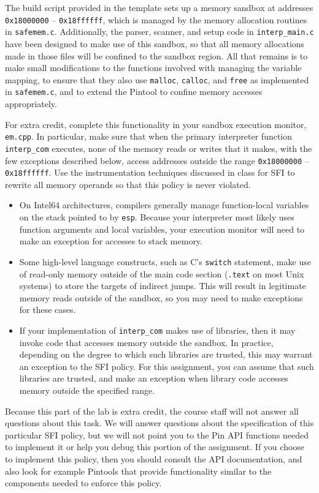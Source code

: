 \documentclass[11pt]{article}
\begin{document}
The build script provided in the template sets up a memory sandbox at addresses \verb'0x18000000' -- \verb'0x18ffffff', which is managed by the memory allocation routines in \verb'safemem.c'. Additionally, the parser, scanner, and setup code in \verb'interp_main.c' have been designed to make use of this sandbox, so that all memory allocations made in those files will be confined to the sandbox region. All that remains is to make small modifications to the functions involved with managing the variable mapping, to ensure that they also use \verb'malloc', \verb'calloc', and \verb'free' as implemented in \verb'safemem.c', and to extend the Pintool to confine memory accesses appropriately.

For extra credit, complete this functionality in your sandbox execution monitor, \verb'em.cpp'. In particular, make sure that when the primary interpreter function \verb'interp_com' executes, none of the memory reads or writes that it makes, with the few exceptions described below, access addresses outside the range \verb'0x18000000' -- \verb'0x18ffffff'. Use the instrumentation techniques discussed in class for SFI to rewrite all memory operands so that this policy is never violated.
\begin{itemize}
\item On Intel64 architectures, compilers generally manage function-local variables on the stack pointed to by \verb'esp'. Because your interpreter most likely uses function arguments and local variables, your execution monitor will need to make an exception for accesses to stack memory.
\item Some high-level language constructs, such as C's \verb'switch' statement, make use of read-only memory outside of the main code section (\verb'.text' on most Unix systems) to store the targets of indirect jumps. This will result in legitimate memory reads outside of the sandbox, so you may need to make exceptions for these cases.
\item If your implementation of \verb'interp_com' makes use of libraries, then it may invoke code that accesses memory outside the sandbox. In practice, depending on the degree to which such libraries are trusted, this may warrant an exception to the SFI policy. For this assignment, you can assume that such libraries are trusted, and make an exception when library code accesses memory outside the specified range.
\end{itemize}
Because this part of the lab is extra credit, the course staff will not answer all questions about this task. We will answer questions about the specification of this particular SFI policy, but we will not point you to the Pin API functions needed to implement it or help you debug this portion of the assignment. If you choose to implement this policy, then you should consult the API documentation, and also look for example Pintools that provide functionality similar to the components needed to enforce this policy.
\end{document}
